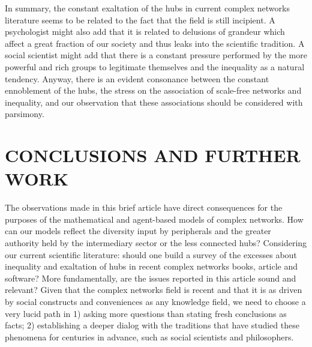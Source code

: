 \documentclass[12pt,fleqn]{article}
\begin{document}
In summary, the constant exaltation of the hubs in current
complex networks literature seems to be related to the
fact that the field is still incipient.
A psychologist might also add that it is related to
delusions of grandeur which affect a great fraction of
our society and thus leaks into the scientific tradition.
A social scientist might add that there is a constant
pressure performed by the more powerful and rich groups
to legitimate themselves and the inequality as a natural tendency.
Anyway, there is an evident consonance between the
constant ennoblement of the hubs, the stress on the association
of scale-free networks and inequality,
and our observation that these associations should be
considered with parsimony.

\section{CONCLUSIONS AND FURTHER WORK}\label{sec:con}
The observations made in this brief article have direct consequences for
the purposes of the mathematical and agent-based models of complex networks.
How can our models reflect the diversity input by peripherals
and the greater authority held by the intermediary sector or the less connected hubs?
Considering our current scientific literature:
should one build a survey of the
excesses about inequality and exaltation of hubs in recent complex networks books, article and software?
More fundamentally, are the issues reported in this article sound
and relevant?
Given that the complex networks field is recent and that it is as driven
by social constructs and conveniences as any knowledge field,
we need to choose a very lucid path
in 1) asking more questions than stating fresh conclusions as facts;
2) establishing a deeper dialog with the traditions that have studied
these phenomena for centuries in advance, such as social scientists and philosophers.
\end{document}
